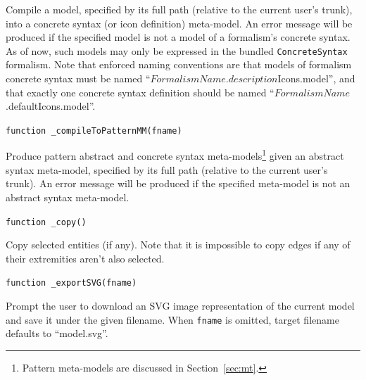 \documentclass{article}
\numberwithin{equation}{section}
\numberwithin{figure}{section}
\begin{document}
Compile a model, specified by its full path (relative to the current user's trunk), into a concrete syntax (or icon definition) meta-model. An error message will be produced if the specified model is not a model of a formalism's concrete syntax. As of now, such models may only be expressed in the bundled \texttt{ConcreteSyntax} formalism. Note that enforced naming conventions are that models of formalism concrete syntax must be named ``$FormalismName$.$description$Icons.model'', and that exactly one concrete syntax definition should be named ``$FormalismName$.defaultIcons.model''.\\
\vspace*{1em}


\begin{center}	{\large \texttt{function \_compileToPatternMM(fname)}} \end{center}

Produce pattern abstract and concrete syntax meta-models\footnote{Pattern meta-models are discussed in Section~\ref{sec:mt}.} given an abstract syntax meta-model, specified by its full path (relative to the current user's trunk). An error message will be produced if the specified meta-model is not an abstract syntax meta-model.\\
\vspace*{1em}


\begin{center}	{\large \texttt{function \_copy()}} \end{center}

Copy selected entities (if any). Note that it is impossible to copy edges if any of their extremities aren't also selected.\\
\vspace*{1em}


\begin{center}	{\large \texttt{function \_exportSVG(fname)}} \end{center}

Prompt the user to download an SVG image representation of the current model and save it under the given filename. When \texttt{fname} is omitted, target filename defaults to ``model.svg''.\\
\vspace*{1em}
\end{document}
